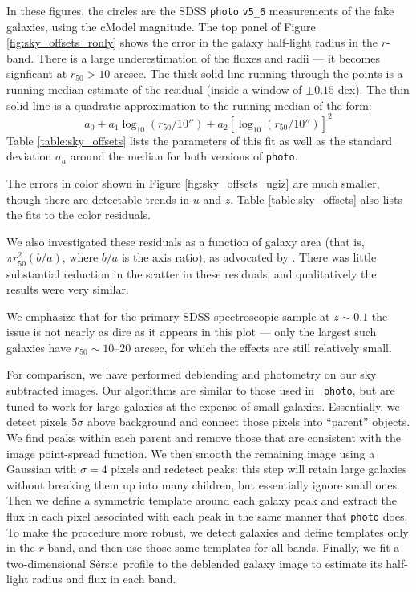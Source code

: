 \documentclass[10pt,preprint]{aastex}
\newcommand{\Sersic}{S\'ersic}
\begin{document}
In these figures, the circles are the SDSS {\tt photo} {\tt v5\_6}
measurements of the fake galaxies, using the cModel magnitude.  The
top panel of Figure \ref{fig:sky_offsets_ronly} shows the error in the
galaxy half-light radius in the $r$-band. There is a large
underestimation of the fluxes and radii --- it becomes signficant at
$r_{50}>10$ arcsec. The thick solid line running through the points is
a running median estimate of the residual (inside a window of $\pm
0.15$ dex). The thin solid line is a quadratic approximation to the
running median of the form:
\begin{equation}
\label{eq:sky_offsets_model}
a_0 + a_1 \log_{10}\left(r_{50}/10''\right)
+ a_2 \left[\log_{10}\left(r_{50}/10''\right)\right]^2
\end{equation}
Table \ref{table:sky_offsets} lists the parameters of this fit as well
as the standard deviation $\sigma_a$ around the median for both
versions of {\tt photo}.

The errors in color shown in Figure \ref{fig:sky_offsets_ugiz} are
much smaller, though there are detectable trends in $u$ and $z$. Table
\ref{table:sky_offsets} also lists the fits to the color residuals.

We also investigated these residuals as a function of galaxy area
(that is, $\pi r_{50}^2 (b/a)$, where $b/a$ is the axis ratio), as
advocated by \citet{west10a}. There was little substantial reduction
in the scatter in these residuals, and qualitatively the results were
very similar.

We emphasize that for the primary SDSS spectroscopic sample at $z\sim
0.1$ the issue is not nearly as dire as it appears in this plot ---
only the largest such galaxies have $r_{50}\sim 10$--20 arcsec, for
which the effects are still relatively small.

For comparison, we have performed deblending and photometry on our sky
subtracted images.  Our algorithms are similar to those used in {\tt
  photo}, but are tuned to work for large galaxies at the expense of
small galaxies. Essentially, we detect pixels 5$\sigma$ above
background and connect those pixels into ``parent'' objects. We find
peaks within each parent and remove those that are consistent with the
image point-spread function. We then smooth the remaining image using
a Gaussian with $\sigma=4$ pixels and redetect peaks: this step will
retain large galaxies without breaking them up into many children, but
essentially ignore small ones. Then we define a symmetric template
around each galaxy peak and extract the flux in each pixel associated
with each peak in the same manner that {\tt photo} does. To make the
procedure more robust, we detect galaxies and define templates only in
the $r$-band, and then use those same templates for all
bands. Finally, we fit a two-dimensional \Sersic\ profile to the
deblended galaxy image to estimate its half-light radius and flux in
each band.
\end{document}
